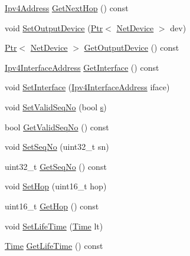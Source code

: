 \begin{DoxyCompactItemize}
\item 
\hyperlink{classns3_1_1Ipv4Address}{Ipv4\+Address} \hyperlink{classns3_1_1aodv_1_1RoutingTableEntry_a30d4b91dbd680186cbbebe59e3beb98e}{Get\+Next\+Hop} () const 
\item 
void \hyperlink{classns3_1_1aodv_1_1RoutingTableEntry_a88667a79e644ae7632a060c8e5f54fc6}{Set\+Output\+Device} (\hyperlink{classns3_1_1Ptr}{Ptr}$<$ \hyperlink{classns3_1_1NetDevice}{Net\+Device} $>$ dev)
\item 
\hyperlink{classns3_1_1Ptr}{Ptr}$<$ \hyperlink{classns3_1_1NetDevice}{Net\+Device} $>$ \hyperlink{classns3_1_1aodv_1_1RoutingTableEntry_ac25f389bb44c799d544dcc200ad32e91}{Get\+Output\+Device} () const 
\item 
\hyperlink{classns3_1_1Ipv4InterfaceAddress}{Ipv4\+Interface\+Address} \hyperlink{classns3_1_1aodv_1_1RoutingTableEntry_aa7209d3b6387030fc37d7ea5beda4bd9}{Get\+Interface} () const 
\item 
void \hyperlink{classns3_1_1aodv_1_1RoutingTableEntry_a7e46ce1d792db20a0b403871577f6192}{Set\+Interface} (\hyperlink{classns3_1_1Ipv4InterfaceAddress}{Ipv4\+Interface\+Address} iface)
\item 
void \hyperlink{classns3_1_1aodv_1_1RoutingTableEntry_abfb5a73ed401db108fce7b903d719589}{Set\+Valid\+Seq\+No} (bool \hyperlink{generate__test__data__lte__sinr_8m_ad83eeb3a142285d1243a08c6b7026df8}{s})
\item 
bool \hyperlink{classns3_1_1aodv_1_1RoutingTableEntry_af6c15a02352471b997e3f71fee302cd7}{Get\+Valid\+Seq\+No} () const 
\item 
void \hyperlink{classns3_1_1aodv_1_1RoutingTableEntry_a797ebc5be8365b64b1212045eaf952b2}{Set\+Seq\+No} (uint32\+\_\+t sn)
\item 
uint32\+\_\+t \hyperlink{classns3_1_1aodv_1_1RoutingTableEntry_af6ea4a33c13d61677073335a2e58ca23}{Get\+Seq\+No} () const 
\item 
void \hyperlink{classns3_1_1aodv_1_1RoutingTableEntry_a0a7c886ad6f75f5f90fd642c866346b9}{Set\+Hop} (uint16\+\_\+t hop)
\item 
uint16\+\_\+t \hyperlink{classns3_1_1aodv_1_1RoutingTableEntry_a8c4e55fd6d92de9877c38a1db218703f}{Get\+Hop} () const 
\item 
void \hyperlink{classns3_1_1aodv_1_1RoutingTableEntry_a4ae3e687225c45915155b4e7f0f76b53}{Set\+Life\+Time} (\hyperlink{classns3_1_1Time}{Time} lt)
\item 
\hyperlink{classns3_1_1Time}{Time} \hyperlink{classns3_1_1aodv_1_1RoutingTableEntry_a342145eb4c5e8300a3895028f7915a74}{Get\+Life\+Time} () const 

\end{DoxyCompactItemize}
